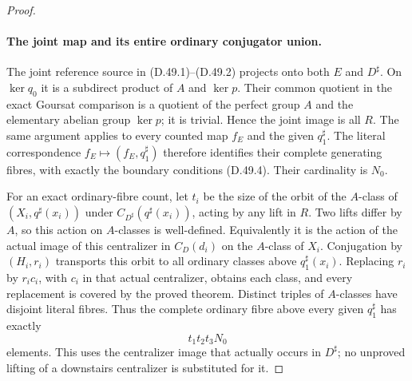 \begin{proof}
\paragraph{The joint map and its entire ordinary conjugator union.}
The joint reference source in \textup{(D.49.1)--(D.49.2)} projects
onto both \(E\) and \(D^\sharp\). On \(\ker q_0\) it is a
subdirect product of \(A\) and \(\ker p\).
Their common quotient in the exact Goursat comparison is a quotient
of the perfect group \(A\) and the elementary abelian group
\(\ker p\); it is trivial. Hence the joint image is all \(R\).
The same argument applies to every counted map \(f_E\) and the
given \(q_1^\sharp\). The literal correspondence
\(f_E\mapsto(f_E,q_1^\sharp)\) therefore identifies their complete
generating fibres, with exactly the boundary conditions
\textup{(D.49.4)}. Their cardinality is \(N_0\).

For an exact ordinary-fibre count, let \(t_i\) be the size of the
orbit of the \(A\)-class of \((X_i,q^\sharp(x_i))\) under
\(C_{D^\sharp}(q^\sharp(x_i))\), acting by any lift in \(R\).
Two lifts differ by \(A\), so this action on \(A\)-classes is
well-defined. Equivalently it is the action of the actual image of
this centralizer in \(C_D(d_i)\) on the \(A\)-class of \(X_i\).
Conjugation by \((H_i,r_i)\) transports this orbit to all ordinary
classes above \(q_1^\sharp(x_i)\). Replacing \(r_i\) by
\(r_ic_i\), with \(c_i\) in that actual centralizer, obtains each
class, and every replacement is covered by the proved theorem.
Distinct triples of \(A\)-classes have disjoint literal fibres.
Thus the complete ordinary fibre above every given \(q_1^\sharp\)
has exactly
\[
                              t_1t_2t_3N_0
 \tag{D.49.26}
\]
elements. This uses the centralizer image that actually occurs in
\(D^\sharp\); no unproved lifting of a downstairs centralizer is
substituted for it.


\end{proof}
